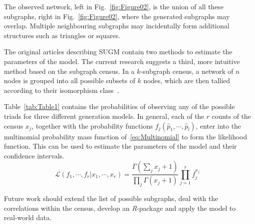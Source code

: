 \documentclass[conference]{IEEEtran}
\begin{document}
The observed network, left in Fig.~\ref{fig:Figure02}, is the union of all these subgraphs, right in Fig.~\ref{fig:Figure02}, where the generated subgraphs may overlap. Multiple neighbouring subgraphs may incidentally form additional structures such as triangles or squares.

The original articles describing SUGM contain two methods to estimate the parameters of the model. The current research suggests a third, more intuitive method based on the subgraph census. In a $k$-subgraph census, a network of $n$ nodes is grouped into all possible subsets of $k$ nodes, which are then tallied according to their isomorphism class~\cite{Davis1972,Holland1970,Holland1976}.

Table~\ref{tab:Table1} contains the probabilities of observing any of the possible triads for three different generation models. In general, each of the $r$ counts of the census $x_{j}$, together with the probability functions $f_{j}(\hat{p}_{1},\cdots,\hat{p}_{l})$, enter into the multinomial probability mass function of~\eqref{eq:Multinomial} to form the likelihood function. This can be used to estimate the parameters of the model and their confidence intervals.
\begin{equation}
\mathcal{L}(f_{1}, \cdots, f_{r} | x_{1}, \cdots, x_{r}) = \frac{\Gamma(\sum_{j} x_{j}+1)}{\prod_{j} \Gamma(x_{j}+1)} \prod_{j=1}^{r} f_{j}^{x_{j}}
\label{eq:Multinomial}
\end{equation}

Future work should extend the list of possible subgraphs, deal with the correlations within the census, develop an \mbox{\textit{R}-package} and apply the model to real-world data.



\end{document}
